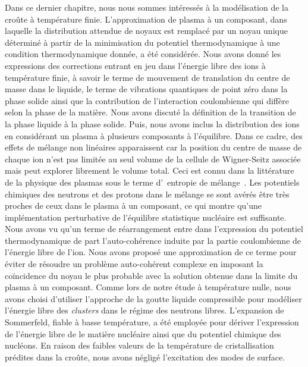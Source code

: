 Dans ce dernier chapitre, nous nous sommes intéressés à la modélisation de la 
croûte à température finie. 
L'approximation de plasma à un composant, dans laquelle la distribution 
attendue de noyaux est remplacé par un noyau unique déterminé à partir de la 
minimisation du potentiel thermodynamique à une condition thermodynamique 
donnée, a été considérée. 
Nous avons donné les expressions des corrections entrant en jeu dans l'énergie 
libre des ions à température finie, à savoir le terme de mouvement de 
translation du centre de masse dans le liquide, le terme de vibrations 
quantiques de point zéro dans la phase solide ainsi que la contribution de 
l'interaction coulombienne qui diffère selon la phase de la matière. 
Nous avons discuté la définition de la transition de la phase liquide à la
phase solide. Puis, nous avons inclus la distribution des ions en considérant 
un plasma à plusieurs composants à l'équilibre. 
%
Dans ce cadre, des effets de mélange non linéaires apparaissent car la 
position du centre de masse de chaque ion n'est pas limitée au seul volume de 
la cellule de Wigner-Seitz associée mais peut explorer librement le 
volume total. 
Ceci est connu dans la littérature de la physique des plasmas sous le terme 
d'\guillemotleft~entropie de mélange~\guillemotright.
Les potentiels chimiques des neutrons et des protons dans le mélange se sont 
avérés être très proches de ceux dans le plasma à un composant, ce qui montre 
qu'une implémentation perturbative de l'équilibre statistique nucléaire est 
suffisante. 
%
Nous avons vu qu'un terme de réarrangement entre dans l'expression du 
potentiel thermodynamique de part l'auto-cohérence induite par la partie 
coulombienne de l'énergie libre de l'ion. 
Nous avons proposé une approximation de ce terme pour éviter de 
résoudre un problème auto-cohérent complexe en imposant la coïncidence du noyau
le plus probable avec la solution obtenue dans la limite du plasma à un 
composant. 
Comme lors de notre étude à température nulle, nous avons choisi d'utiliser 
l'approche de la goutte liquide compressible pour modéliser l'énergie libre des
\textit{clusters} dans le régime des neutrons libres. 
L'expansion de Sommerfeld, fiable à basse température, a été employée pour 
dériver l'expression de l'énergie libre de le matière nucléaire ainsi que 
du potentiel chimique des nucléons. 
En raison des faibles valeurs de la température de cristallisation prédites 
dans la croûte, nous avons négligé l'excitation des modes de surface. 

